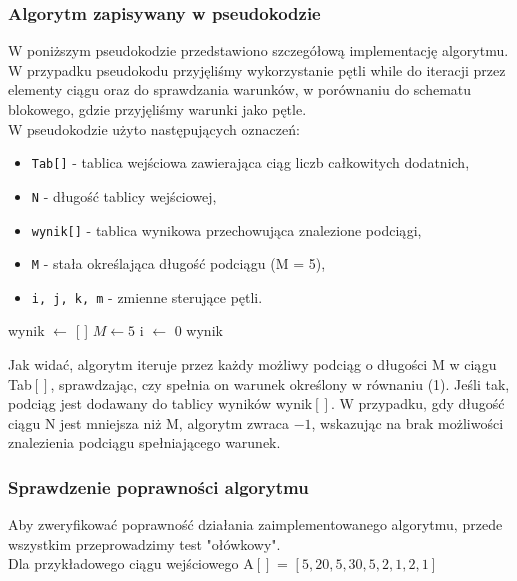 \documentclass[12pt]{article}
\begin{document}
\newpage

\subsubsection{Algorytm zapisywany w pseudokodzie}
W poniższym pseudokodzie przedstawiono szczegółową implementację algorytmu. W przypadku pseudokodu przyjęliśmy wykorzystanie pętli while do iteracji przez elementy ciągu oraz do sprawdzania warunków, w porównaniu do schematu blokowego, gdzie przyjęliśmy warunki jako pętle.\\

W pseudokodzie użyto następujących oznaczeń:
\begin{itemize}
	\item \texttt{Tab[]} - tablica wejściowa zawierająca ciąg liczb całkowitych dodatnich,
	\item \texttt{N} - długość tablicy wejściowej,
	\item \texttt{wynik[]} - tablica wynikowa przechowująca znalezione podciągi,
	\item \texttt{M} - stała określająca długość podciągu (M = 5),
	\item \texttt{i, j, k, m} - zmienne sterujące pętli.
\end{itemize}

\begin{algorithm}[H]
wynik $\gets$ [ ]\;
\KwConst $M \gets 5$\;
i $\gets$ 0\;
\Return wynik\;
\end{algorithm}

Jak widać, algorytm iteruje przez każdy możliwy podciąg o długości M w ciągu Tab$[]$, sprawdzając, czy spełnia on warunek określony w równaniu (1). Jeśli tak, podciąg jest dodawany do tablicy wyników wynik$[]$. W przypadku, gdy długość ciągu N jest mniejsza niż M, algorytm zwraca $-1$, wskazując na brak możliwości znalezienia podciągu spełniającego warunek.
\newpage
\subsubsection{Sprawdzenie poprawności algorytmu}
Aby zweryfikować poprawność działania zaimplementowanego algorytmu, przede wszystkim przeprowadzimy test "ołówkowy".\\
Dla przykładowego ciągu wejściowego A$[]$ = $[5, 20, 5, 30, 5, 2, 1, 2, 1]$
\end{document}
